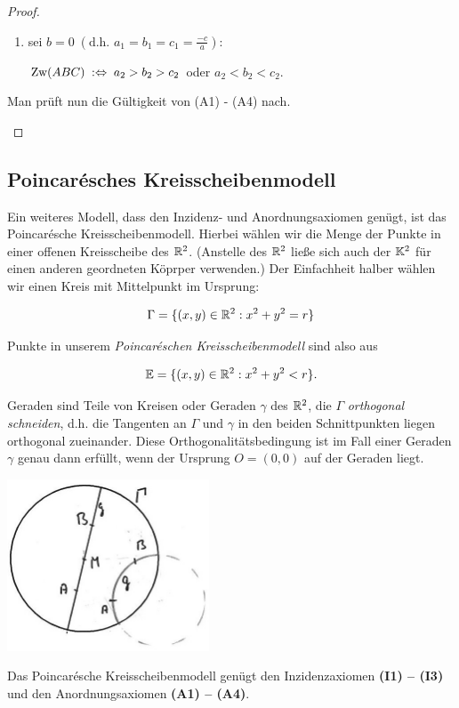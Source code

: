\begin{proof}
\begin{itemize}
\begin{enumerate}
                \item sei $b = 0\; (\mbox{d.h. } a_1 = b_1 = c_1 = \frac{-c}{a}):$

                    $\operatorname{Zw}(ABC)\;: \Leftrightarrow\; a_2 > b_2 > c_2$ oder $a_2 < b_2 < c_2$.
            \end{enumerate}

            Man prüft nun die Gültigkeit von (A1) - (A4) nach. %
    \end{itemize}
\end{proof}

\subsection*{Poincarésches Kreisscheibenmodell}

Ein weiteres Modell, dass den Inzidenz- und Anordnungsaxiomen genügt, ist das Poincarésche
Kreisscheibenmodell. Hierbei wählen wir die Menge der Punkte in einer offenen Kreisscheibe des
$\mathbb R^2$. (Anstelle des $\mathbb R^2$ ließe sich auch der $\mathbb K^2$ für einen anderen geordneten Köprper
verwenden.) Der Einfachheit halber wählen wir einen Kreis mit Mittelpunkt im Ursprung:

$$
    \Gamma = \{ (x,y) \in \mathbb R^2 :  x^2 + y^2 = r \}
$$

Punkte in unserem {\em  Poincaréschen Kreisscheibenmodell} sind also aus

$$
    \mathbb E = \{ (x,y) \in \mathbb R^2 :  x^2 + y^2 < r \}.
$$

Geraden sind Teile von Kreisen oder Geraden $\gamma$ des $\mathbb R^2$, die $\Gamma$ {\em orthogonal
schneiden}, d.h. die Tangenten an $\Gamma$ und $\gamma$ in den beiden Schnittpunkten liegen
orthogonal zueinander. Diese Orthogonalitätsbedingung ist im Fall einer Geraden $\gamma$ genau dann
erfüllt, wenn der Ursprung $O = (0,0)$ auf der Geraden liegt.

\centerline{\includegraphics[width=6cm]{BILDER/4-2-04b-Geraden.jpg}}

\begin{thm} \label{thm:PoincareKreisscheibe}
    Das Poincarésche Kreisscheibenmodell genügt den Inzidenzaxiomen {\bf (I1) -- (I3)} und den
    Anordnungsaxiomen {\bf (A1) -- (A4)}.
\end{thm}

